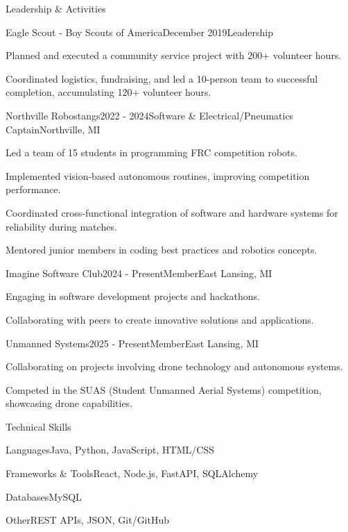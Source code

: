 \documentclass[
	11pt
]{resume}
\begin{document}
	\begin{rSection}{Leadership \& Activities}
		\begin{rSectionEntry}{Eagle Scout - Boy Scouts of America}{December 2019}{Leadership}{}
			\item Planned and executed a community service project with 200+ volunteer hours.
			\item Coordinated logistics, fundraising, and led a 10-person team to successful completion, accumulating 120+ volunteer hours.
		\end{rSectionEntry}

		\begin{rSectionEntry}{Northville Robostangs}{2022 - 2024}{Software \& Electrical/Pneumatics Captain}{Northville, MI}
			\item Led a team of 15 students in programming FRC competition robots.
			\item Implemented vision-based autonomous routines, improving competition performance.
			\item Coordinated cross-functional integration of software and hardware systems for reliability during matches.
			\item Mentored junior members in coding best practices and robotics concepts.
		\end{rSectionEntry}

		\begin{rSectionEntry}{Imagine Software Club}{2024 - Present}{Member}{East Lansing, MI}
			\item Engaging in software development projects and hackathons.
			\item Collaborating with peers to create innovative solutions and applications.
		\end{rSectionEntry}

		\begin{rSectionEntry}{Unmanned Systems}{2025 - Present}{Member}{East Lansing, MI}
			\item Collaborating on projects involving drone technology and autonomous systems.
			\item Competed in the SUAS (Student Unmanned Aerial Systems) competition, showcasing drone capabilities.
		\end{rSectionEntry}
	\end{rSection}

	\begin{rSection}{Technical Skills}
		\begin{rSet}{Languages}{Java, Python, JavaScript, HTML/CSS}
		\end{rSet}
		\begin{rSet}{Frameworks \& Tools}{React, Node.js, FastAPI, SQLAlchemy}
		\end{rSet}
		\begin{rSet}{Databases}{MySQL}
		\end{rSet}
		\begin{rSet}{Other}{REST APIs, JSON, Git/GitHub}
		\end{rSet}
	\end{rSection}
\end{document}
